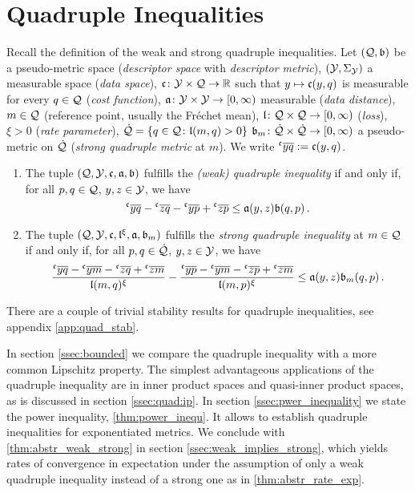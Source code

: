 \section{Quadruple Inequalities}\label{sec:quadruple}
%
Recall the definition of the weak and strong quadruple inequalities.
Let $(\mathcal{Q}, \mathfrak{b})$ be a pseudo-metric space (\textit{descriptor space} with \textit{descriptor metric}), 
$(\mathcal{Y}, \Sigma_{\mathcal{Y}})$ a measurable space (\textit{data space}), 
$\mathfrak{c} \colon \mathcal{Y} \times \mathcal{Q} \to \mathbb{R}$ such that $y\mapsto \mathfrak{c}(y,q)$ is measurable for every $q\in\mathcal{Q}$ (\textit{cost function}),
$\mathfrak{a} \colon \mathcal{Y} \times \mathcal{Y} \to [0,\infty)$ measurable (\textit{data distance}),
$m \in \mathcal{Q}$ (reference point, usually the Fréchet mean),
$\mathfrak{l}\colon \mathcal{Q} \times \mathcal{Q} \to [0,\infty)$ (\textit{loss}),
$\xi > 0$ (\textit{rate parameter}),
$\dot{\mathcal{Q}} = \left\lbrace q\in\mathcal{Q}\colon \mathfrak{l}(m, q) > 0 \right\rbrace$
$\mathfrak{b}_m \colon \dot{\mathcal{Q}} \times \dot{\mathcal{Q}} \to [0,\infty)$ a pseudo-metric on $\dot{\mathcal{Q}}$ (\textit{strong quadruple metric} at $m$).
We write $\olc yq :=\mf c(y,q)$.
%
\begin{enumerate}[label=(\alph*)]
\item 
The tuple $(\mathcal{Q}, \mathcal{Y}, \mathfrak{c}, \mathfrak{a}, \mathfrak{b})$ fulfills the \emph{(weak) quadruple inequality}
	if and only if,
	for all $p,q\in\mathcal{Q}$, $y,z\in\mathcal{Y}$, we have
	\begin{equation*}
		\olc yq- \olc zq -\olc yp+\olc zp \leq \mf a(y,z) \mf b(q,p)
		\eqfs
	\end{equation*}
\item	
	The tuple $(\mathcal{Q}, \mathcal{Y}, \mathfrak{c}, \mathfrak{l}^\xi, \mathfrak{a}, \mathfrak{b}_m)$ fulfills the \emph{strong quadruple inequality} at $m\in\mathcal{Q}$ 
	if and only if,
	for all $p,q\in\dot{\mathcal{Q}}$, $y,z\in\mathcal{Y}$, we have
	\begin{equation*}
		\frac{\olc yq- \olc ym- \olc zq + \olc zm}{\mf l(m,q)^\xi} - \frac{\olc yp- \olc ym- \olc zp + \olc zm}{\mf l(m,p)^\xi} \leq \mf a(y,z) \mf b_m(q,p)
		\eqfs
	\end{equation*}
\end{enumerate}
%
There are a couple of trivial stability results for quadruple inequalities, see appendix \autoref{app:quad_stab}.

In section \ref{ssec:bounded} we compare the quadruple inequality with a more common Lipschitz property. The simplest advantageous applications of the quadruple inequality are in inner product spaces and quasi-inner product spaces, as is discussed in section \ref{ssec:quad:ip}. In section \ref{ssec:pwer_inequality} we state the power inequality, \autoref{thm:power_inequ}. It allows to establish quadruple inequalities for exponentiated metrics. We conclude with \autoref{thm:abstr_weak_strong} in section \ref{ssec:weak_implies_strong}, which yields rates of convergence in expectation under the assumption of only a weak quadruple inequality instead of a strong one as in \autoref{thm:abstr_rate_exp}.
%
%
